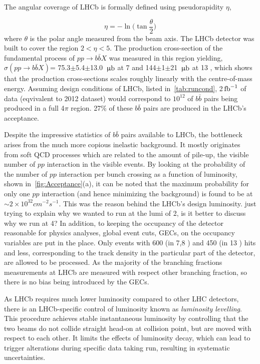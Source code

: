 The angular coverage of \Gls{LHCb} is formally defined using pseudorapidity $\eta$, 

\begin{equation}
	\eta = -\ln \Big(\tan\frac{\theta}{2}\Big)
\end{equation}	
where $\theta$ is the polar angle measured from the beam axis. The \Gls{LHCb} detector was built to cover the region $2<\eta<5$. The production cross-section of the fundamental process of $pp\rightarrow b\bar{b}X$ was measured in this region yielding, $\sigma (pp\rightarrow b\bar{b}X)$= 75.3$\pm$5.4$\pm$13.0 ${\rm \,\upmu b}$ at 7 \tev \cite{LHCb-PAPER-2010-002} and 144$\pm$1$\pm$21 ${\rm \,\upmu b}$ at 13 \tev \cite{LHCb-PAPER-2016-031}, which shows that the production cross-sections scales roughly linearly with the centre-of-mass energy. Assuming design conditions of \gls{LHCb}, listed in~\autoref{tab:runcond}, 2$\mbox{\,fb}^{-1}$ of data (eqvivalent to 2012 dataset) would correspond to $10^{12}$ of $b\bar{b}$ pairs being produced in a full 4$\pi$ region. 27\% of these $b\bar{b}$ pairs are produced in the LHCb's acceptance. 


Despite the impressive statistics of $b\bar{b}$ pairs available to \Gls{LHCb}, the bottleneck arises from the much more copious inelastic background. It mostly originates from soft QCD processes which are related to the amount of pile-up, the visible number of $pp$ interaction in the visible events. By looking at the probability of the number of $pp$ interaction per bunch crossing as a function of luminosity, shown in~\autoref{fig:Acceptance}(a), it can be noted that the maximum probability for only one $pp$ interaction (and hence minimizing the background) is found to be at $\sim 2 \times10^{32} cm^{-2} s^{-1}$.  This was the reason behind the \gls{LHCb}'s design luminosity.\color{red} just trying to explain why we wanted to run at the lumi of 2, is it better to discuss why we run at 4? \color{black}In addition, to keeping the occupancy of the detector reasonable for physics analyses, global event cuts, GECs, on the occupancy variables are put in the place. Only events with 600 (in 7,8 \tev) and 450 (in 13 \tev) hits and less, corresponding to the track density in the particular part of the detector, are allowed to be processed.
As the majority of the branching fractions measurements at \gls{LHCb} are measured with respect other branching fraction, so there is no bias being introduced by the GECs. 

As \Gls{LHCb} requires much lower luminosity compared to other \gls{LHC} detectors, there is an LHCb-specific control of luminosity known as \textit{luminosity levelling}. This procedure achieves stable instantaneous luminosity by controlling that the two beams do not collide straight head-on at collision point, but are moved with respect to each other. It limits the effects of luminosity decay, which can lead to trigger alterations during specific data taking run, resulting in systematic uncertainties.



